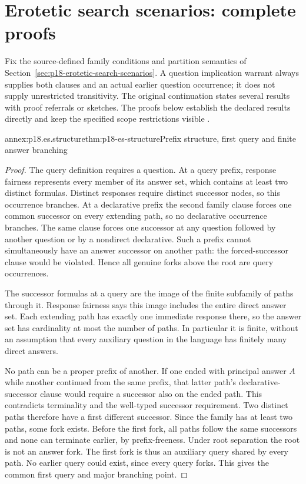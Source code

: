 \section{Erotetic search scenarios: complete proofs}
\label{sec:p18-erotetic-search-annex}

Fix the source-defined family conditions and partition semantics of
Section~\ref{sec:p18-erotetic-search-scenarios}. A question implication warrant
always supplies both clauses and an actual earlier question occurrence; it
does not supply unrestricted transitivity. The original continuation states
several results with proof referrals or sketches. The proofs below establish
the declared results directly and keep the specified scope restrictions visible
\cite[pp.~30--43]{Wisniewski2001QuestionsInferences}.

\begin{annexitem}{annex:p18.es.structure}{thm:p18-es-structure}{Prefix structure, first query and finite answer branching}
\begin{proof}
The query definition requires a question. At a query prefix, response fairness
represents every member of its answer set, which contains at least two distinct
formulas. Distinct responses require distinct successor nodes, so this occurrence
branches. At a declarative prefix the second family clause forces one common
successor on every extending path, so no declarative occurrence branches.
The same clause forces one successor at any question followed by another question
or by a nondirect declarative. Such a prefix cannot simultaneously have an
answer successor on another path: the forced-successor clause would be violated.
Hence all genuine forks above the root are query occurrences.

The successor formulas at a query are the image of the finite subfamily of
paths through it. Response fairness says this image includes the entire direct
answer set. Each extending path has exactly one immediate response there, so
the answer set has cardinality at most the number of paths. In particular it
is finite, without an assumption that every auxiliary question in the language
has finitely many direct answers.

No path can be a proper prefix of another. If one ended with principal answer
\(A\) while another continued from the same prefix, that latter path's
declarative-successor clause would require a successor also on the ended path.
This contradicts terminality and the well-typed successor requirement. Two
distinct paths therefore have a first different successor. Since the family
has at least two paths, some fork exists. Before the first fork, all paths
follow the same successors and none can terminate earlier, by prefix-freeness.
Under root separation the root is not an answer fork. The first fork is thus
an auxiliary query shared by every path. No earlier query could exist, since
every query forks. This gives the common first query and major branching point.


\end{proof}
\end{annexitem}
